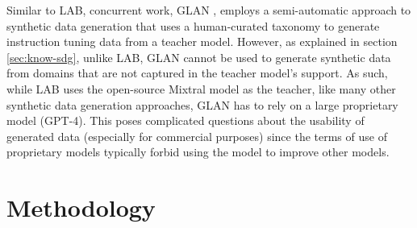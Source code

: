 Similar to LAB, concurrent work, GLAN \citep{li2024synthetic}, employs a semi-automatic approach to synthetic data generation that uses a human-curated taxonomy to generate instruction tuning data from a teacher model. However, as explained in section \ref{sec:know-sdg}, unlike LAB, GLAN cannot be used to generate synthetic data from domains that are not captured in the teacher model's support. As such, while LAB uses the open-source Mixtral model as the teacher, like many other synthetic data generation approaches, GLAN has to rely on a large proprietary model (GPT-4). This poses complicated questions about the usability of generated data (especially for commercial purposes) since the terms of use of proprietary models typically forbid using the model to improve other models.

\section{Methodology}

